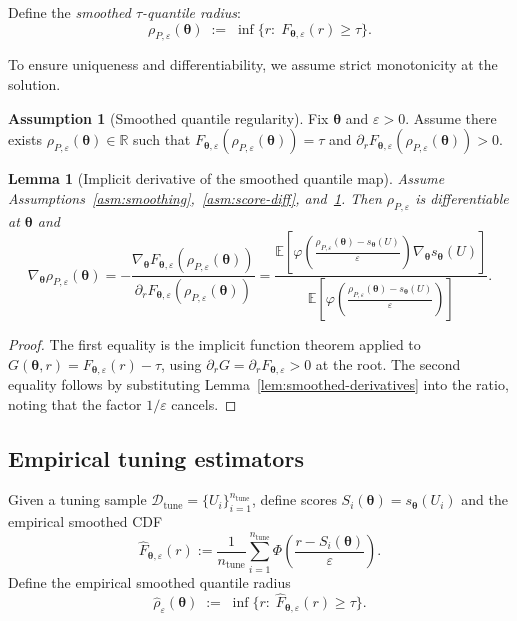 \documentclass[11pt]{article}
\newcommand{\R}{\mathbb{R}}
\newcommand{\E}{\mathbb{E}}
\newcommand{\cD}{\mathcal{D}}
\newcommand{\btheta}{\bm{\theta}}
\theoremstyle{plain}
\newtheorem{lemma}[theorem]{Lemma}
\theoremstyle{definition}
\newtheorem{assumption}[theorem]{Assumption}
\begin{document}
Define the \emph{smoothed $\tau$-quantile radius}:
\begin{equation}\label{eq:rho-eps}
\rho_{P,\varepsilon}(\btheta)
\;:=\;
\inf\{r:\;F_{\btheta,\varepsilon}(r)\ge \tau\}.
\end{equation}

To ensure uniqueness and differentiability, we assume strict monotonicity at the solution.

\begin{assumption}[Smoothed quantile regularity]\label{asm:smoothed-quantile-reg}
Fix $\btheta$ and $\varepsilon>0$. Assume there exists $\rho_{P,\varepsilon}(\btheta)\in\R$ such that
$F_{\btheta,\varepsilon}(\rho_{P,\varepsilon}(\btheta))=\tau$ and
$\partial_r F_{\btheta,\varepsilon}(\rho_{P,\varepsilon}(\btheta))>0$.
\end{assumption}

\begin{lemma}[Implicit derivative of the smoothed quantile map]\label{lem:smoothed-quantile-deriv}
Assume Assumptions~\ref{asm:smoothing},~\ref{asm:score-diff}, and~\ref{asm:smoothed-quantile-reg}.
Then $\rho_{P,\varepsilon}$ is differentiable at $\btheta$ and
\begin{equation}\label{eq:rhoeps-deriv}
\nabla_{\btheta}\rho_{P,\varepsilon}(\btheta)
=
-\frac{\nabla_{\btheta}F_{\btheta,\varepsilon}(\rho_{P,\varepsilon}(\btheta))}{\partial_r F_{\btheta,\varepsilon}(\rho_{P,\varepsilon}(\btheta))}
=
\frac{
\E\left[\varphi\left(\frac{\rho_{P,\varepsilon}(\btheta)-s_{\btheta}(U)}{\varepsilon}\right)\nabla_{\btheta}s_{\btheta}(U)\right]
}{
\E\left[\varphi\left(\frac{\rho_{P,\varepsilon}(\btheta)-s_{\btheta}(U)}{\varepsilon}\right)\right]
}.
\end{equation}
\end{lemma}

\begin{proof}
The first equality is the implicit function theorem applied to $G(\btheta,r)=F_{\btheta,\varepsilon}(r)-\tau$,
using $\partial_r G=\partial_r F_{\btheta,\varepsilon}>0$ at the root.
The second equality follows by substituting Lemma~\ref{lem:smoothed-derivatives} into the ratio, noting that the factor $1/\varepsilon$ cancels.
\end{proof}

\subsection{Empirical tuning estimators}

Given a tuning sample $\cD_{\mathrm{tune}}=\{U_i\}_{i=1}^{n_{\mathrm{tune}}}$, define scores $S_i(\btheta)=s_{\btheta}(U_i)$ and the empirical smoothed CDF
\begin{equation}\label{eq:Fhat}
\hat F_{\btheta,\varepsilon}(r)
:=
\frac{1}{n_{\mathrm{tune}}}
\sum_{i=1}^{n_{\mathrm{tune}}}
\Phi\left(\frac{r-S_i(\btheta)}{\varepsilon}\right).
\end{equation}
Define the empirical smoothed quantile radius
\begin{equation}\label{eq:rhohat-eps}
\hat\rho_{\varepsilon}(\btheta)
\;:=\;
\inf\{r:\;\hat F_{\btheta,\varepsilon}(r)\ge \tau\}.
\end{equation}
\end{document}
